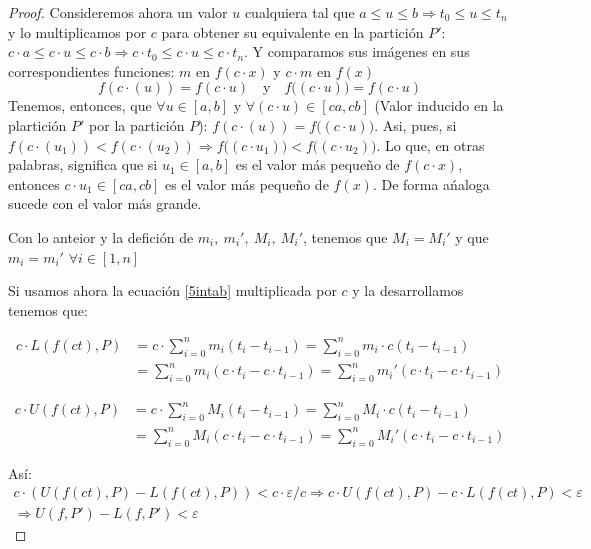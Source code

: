 \documentclass[12pt]{article}
\begin{document}
\begin{proof}
    Consideremos ahora un valor $u$ cualquiera tal que \(a\leq u\leq b \Longrightarrow t_{0}\leq u\leq t_n\) y lo multiplicamos por $c$ para obtener su equivalente en la partici\'on $P'$: \(c\cdot a\leq c\cdot u\leq c\cdot b \Longrightarrow c\cdot t_{0}\leq c\cdot u\leq c\cdot t_n\).\bigskip
    Y comparamos sus im\'agenes en sus correspondientes funciones: $m$ en \(f(c\cdot x)\) y $c\cdot m$ en \(f(x)\)
    \[f(c\cdot (u))=f(c\cdot u) \quad \text{y}  \quad f\big((c\cdot u)\big)=f(c\cdot u)\]
    Tenemos, entonces, que \(\forall u\in[a,b]\) y \(\forall (c\cdot u) \in [ca,cb]\) (Valor inducido en la plartici\'on $P'$ por la partici\'on $P$): \(f(c\cdot (u))=f\big((c\cdot u)\big)\).\bigskip
    Asi, pues, si \(f(c\cdot (u_1))<f(c\cdot (u_2)) \Longrightarrow f\big((c\cdot u_1)\big)<f\big((c\cdot u_2)\big)\). Lo que, en otras palabras, significa que si \(u_1\in[a,b]\) es el valor m\'as pequeño de $f(c\cdot x)$, entonces \(c\cdot u_1\in[ca,cb]\) es el valor m\'as pequeño de $f(x)$. De forma a\'naloga sucede con el valor m\'as grande.\bigskip

    Con lo anteior y la defici\'on de \(m_i, \ m_i', \ M_i, \ M_i'\), tenemos que \(M_i=M_i'\) y que \(m_i=m_i'\) \(\forall i\in[1,n]\)

    Si usamos ahora la ecuaci\'on \eqref{5intab} multiplicada por $c$ y la desarrollamos tenemos que:

    \begin{align*}
        c\cdot L(f(ct),P) &= c \cdot \sum_{i=0}^n m_i(t_i-t_{i-1}) = \sum_{i=0}^n m_i\cdot c(t_i-t_{i-1}) \\
        &= \sum_{i=0}^n m_i(c\cdot t_i-c\cdot t_{i-1}) = \sum_{i=0}^n m_i'(c\cdot t_i-c\cdot t_{i-1})
    \end{align*}

    \begin{align*}
        c\cdot U(f(ct),P) &= c \cdot \sum_{i=0}^n M_i(t_i-t_{i-1}) = \sum_{i=0}^n M_i\cdot c(t_i-t_{i-1}) \\
        &= \sum_{i=0}^n M_i(c\cdot t_i-c\cdot t_{i-1}) = \sum_{i=0}^n M_i'(c\cdot t_i-c\cdot t_{i-1})
    \end{align*}

    As\'i:
    \begin{multline*}
        c\cdot(U(f(ct),P)-L(f(ct),P))<c\cdot\varepsilon/c \Longrightarrow c\cdot U(f(ct),P)-c\cdot L(f(ct),P)< \varepsilon \\ \Longrightarrow U(f,P')-L(f,P')<\varepsilon
    \end{multline*}


\end{proof}
\end{document}
